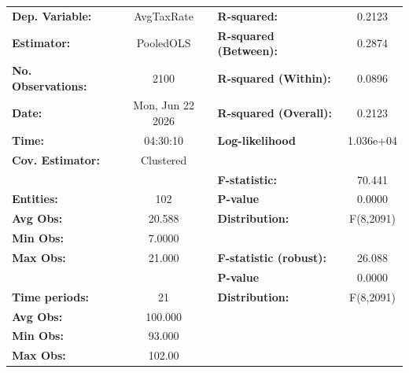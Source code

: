 \begin{center}
\begin{tabular}{lclc}
\toprule
\textbf{Dep. Variable:}                       &     AvgTaxRate     & \textbf{  R-squared:         }   &      0.2123      \\
\textbf{Estimator:}                           &     PooledOLS      & \textbf{  R-squared (Between):}  &      0.2874      \\
\textbf{No. Observations:}                    &        2100        & \textbf{  R-squared (Within):}   &      0.0896      \\
\textbf{Date:}                                &  Mon, Jun 22 2026  & \textbf{  R-squared (Overall):}  &      0.2123      \\
\textbf{Time:}                                &      04:30:10      & \textbf{  Log-likelihood     }   &    1.036e+04     \\
\textbf{Cov. Estimator:}                      &     Clustered      & \textbf{                     }   &                  \\
\textbf{}                                     &                    & \textbf{  F-statistic:       }   &      70.441      \\
\textbf{Entities:}                            &        102         & \textbf{  P-value            }   &      0.0000      \\
\textbf{Avg Obs:}                             &       20.588       & \textbf{  Distribution:      }   &    F(8,2091)     \\
\textbf{Min Obs:}                             &       7.0000       & \textbf{                     }   &                  \\
\textbf{Max Obs:}                             &       21.000       & \textbf{  F-statistic (robust):} &      26.088      \\
\textbf{}                                     &                    & \textbf{  P-value            }   &      0.0000      \\
\textbf{Time periods:}                        &         21         & \textbf{  Distribution:      }   &    F(8,2091)     \\
\textbf{Avg Obs:}                             &      100.000       & \textbf{                     }   &                  \\
\textbf{Min Obs:}                             &       93.000       & \textbf{                     }   &                  \\
\textbf{Max Obs:}                             &       102.00       & \textbf{                     }   &                  \\

\end{tabular}
\end{center}
